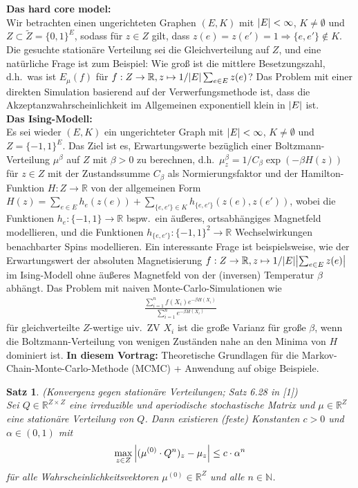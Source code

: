 \documentclass[twoside]{article}
\newcounter{lecnum}
\newtheorem{theorem}{Satz}[lecnum]
\theoremstyle{definition}
\begin{document}
\textbf{Das hard core model:}\\
Wir betrachten einen ungerichteten Graphen $(E,K)$ mit $\abs{E} < \infty$, $K \neq \emptyset$ und $Z \subset \tilde{Z}=\{0,1\}^E$, sodass für $z \in Z$ gilt, dass $z(e)=z(e')=1 \Rightarrow \{e,e'\} \notin K$. Die gesuchte stationäre Verteilung sei die Gleichverteilung auf $Z$, und eine natürliche Frage ist zum Beispiel: Wie groß ist die mittlere Besetzungszahl, d.h.\ was ist $E_\mu(f)$ für $f:Z \to \mathbb{R}, z \mapsto 1/\abs{E} \sum_ {e \in E} z(e)$? Das Problem mit einer direkten Simulation basierend auf der Verwerfungsmethode ist, dass die Akzeptanzwahrscheinlichkeit im Allgemeinen exponentiell klein in $\abs{E}$ ist.\\

\textbf{Das Ising-Modell:}\\
Es sei wieder $(E,K)$ ein ungerichteter Graph mit $\abs{E} < \infty$, $K \neq \emptyset$ und $Z =\{-1,1\}^E$. Das Ziel ist es, Erwartungswerte bezüglich einer Boltzmann-Verteilung $\mu^\beta$ auf $Z$ mit $\beta>0$ zu berechnen, d.h.\ $\mu^\beta_z = 1/C_\beta \exp(-\beta H(z))$ für $z \in Z$ mit der Zustandssumme $C_\beta$ als Normierungsfaktor und der Hamilton-Funktion $H:Z\to \mathbb{R}$ von der allgemeinen Form $H(z) = \sum_{e \in E} h_e(z(e)) + \sum_{\{e,e'\}\in K} h_{\{e,e'\}}(z(e),z(e'))$, wobei die Funktionen $h_e:\{-1,1\} \to \mathbb{R}$ bspw.\ ein äußeres, ortsabhängiges Magnetfeld modellieren, und die Funktionen $h_{\{e,e'\}}:\{-1,1\}^2\to \mathbb{R}$ Wechselwirkungen benachbarter Spins modellieren. Ein interessante Frage ist beispielsweise, wie der Erwartungswert der absoluten Magnetisierung $f:Z \to \mathbb{R}, z \mapsto 1/\abs{E} \abs{\sum_ {e \in E} z(e)}$ im Ising-Modell ohne äußeres Magnetfeld von der (inversen) Temperatur $\beta$ abhängt. Das Problem mit naiven Monte-Carlo-Simulationen wie
\begin{align*}
\frac{\sum_{i=1}^n f(X_i) e^{-\beta H(X_i)}}{\sum_{i=1}^n e^{-\beta H(X_i)}}
\end{align*}
für gleichverteilte $Z$-wertige uiv.\ ZV $X_i$ ist die große Varianz für große $\beta$, wenn die Boltzmann-Verteilung von wenigen Zuständen nahe an den Minima von $H$ dominiert ist. 
\newpage
\textbf{In diesem Vortrag:}
Theoretische Grundlagen für die Markov-Chain-Monte-Carlo-Methode (MCMC) + Anwendung auf obige Beispiele.
\begin{theorem}(Konvergenz gegen stationäre Verteilungen; Satz 6.28 in [1])\\
Sei $Q \in \mathbb{R}^{Z \times Z}$ eine irreduzible und aperiodische stochastische Matrix und $\mu \in \mathbb{R}^Z$ eine stationäre Verteilung von $Q$. Dann existieren (feste) Konstanten $c>0$ und $\alpha \in (0,1)$ mit
\begin{align}
\max_{z \in Z} \abs{(\mu^{(0)} \cdot Q^n)_z - \mu_z} \leq c \cdot \alpha^n
\end{align}
für alle Wahrscheinlichkeitsvektoren $\mu^{(0)} \in \mathbb{R}^Z$ und alle $n \in \mathbb{N}$.
\end{theorem}
\end{document}
